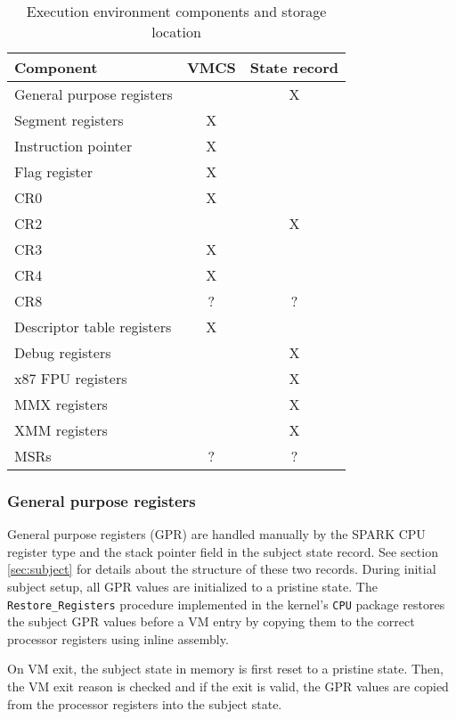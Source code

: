 \begin{table}[h]
	\centering
	\begin{tabular}{l || c | c}
		\textbf{Component} & \textbf{VMCS} & \textbf{State record} \\
		\hline
		General purpose registers  &   & X \\
		Segment registers          & X &   \\
		Instruction pointer        & X &   \\
		Flag register              & X &   \\
		CR0                        & X &   \\
		CR2                        &   & X \\
		CR3                        & X &   \\
		CR4                        & X &   \\
		CR8                        & ? & ? \\
		Descriptor table registers & X &   \\
		Debug registers            &   & X \\
		x87 FPU registers          &   & X \\
		MMX registers              &   & X \\
		XMM registers              &   & X \\
		MSRs                       & ? & ? \\
		\hline
	\end{tabular}
	\caption{Execution environment components and storage location}
	\label{tab:exec-env-storage}
\end{table}

\subsubsection{General purpose registers}
General purpose registers (GPR) are handled manually by the SPARK CPU
register type and the stack pointer field in the subject state record. See
section \ref{sec:subject} for details about the structure of these two records.
During initial subject setup, all GPR values are initialized to a pristine
state. The \texttt{Restore\_Registers} procedure implemented in the kernel's
\texttt{CPU} package restores the subject GPR values before a VM entry by
copying them to the correct processor registers using inline assembly.

On VM exit, the subject state in memory is first reset to a pristine state.
Then, the VM exit reason is checked and if the exit is valid, the GPR values are
copied from the processor registers into the subject state.

